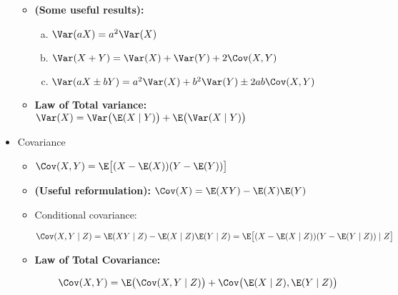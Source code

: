 \begin{itemize}
\begin{itemize}
\item \begin{theorem} \textbf{(Some useful results):} 


\begin{enumerate}[(a)]

\item \(\Var(aX) = a^2 \Var(X)\)

\item \(\Var(X + Y) = \Var(X) + \Var(Y) + 2 \Cov(X, Y)\)

\item \(\Var(aX \pm bY) = a^2\Var(X) + b^2\Var(Y) \pm 2ab \Cov(X, Y)\) 

\end{enumerate}
\end{theorem}

\item \begin{theorem} \textbf{Law of Total variance:} \( \Var(X) = \Var \big( \E(X \mid Y) \big) + \E \big( \Var(X \mid Y) \big) \)\end{theorem}

\end{itemize}

\item Covariance

\begin{itemize}

\item \begin{definition} \( \Cov(X, Y ) = \E \big[ (X - \E(X))(Y - \E(Y))\big] \) \end{definition}

\item \begin{proposition} \textbf{(Useful reformulation):} \(\Cov(X) = \E(XY) - \E(X)\E(Y)\) \end{proposition}

\item \begin{definition} Conditional covariance: 

\[
\Cov(X, Y \mid Z) = \E(XY \mid Z) - \E(X \mid Z) \E(Y \mid Z) = \E \big[ (X - \E(X \mid Z))(Y - \E(Y \mid Z)) \mid Z\big]
\] \end{definition}

\item \begin{theorem} \textbf{Law of Total Covariance:}

\[
\Cov(X, Y) = \E\big(\Cov(X, Y \mid Z) \big) + \Cov \big(\E(X \mid Z), \E(Y \mid Z) \big)
\]
\end{theorem}

\end{itemize}

\end{itemize}


